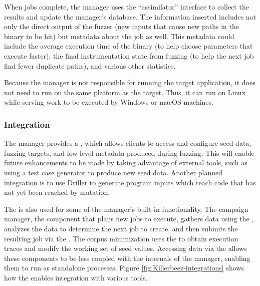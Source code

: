When jobs complete, the manager uses the \BOINC{} ``assimilator'' interface to
collect the results and update the manager's database. The information inserted
includes not only the direct output of the fuzzer (new inputs that cause new
paths in the binary to be hit) but metadata about the job as well. This metadata
could include the average execution time of the binary (to help choose
parameters that execute faster), the final instrumentation state from fuzzing
(to help the next job find fewer duplicate paths), and various other statistics.

Because the manager is not responsible for running the target application, it
does not need to run on the same platform as the target.  Thus, it can run on Linux while
serving work to be executed by Windows or macOS machines.

\subsubsection{Integration}
The manager provides a \REST{} \API{}, which allows clients
to access and configure seed data, fuzzing targets, and low-level metadata
produced during fuzzing.
This will enable future enhancements to be made by taking advantage of
external tools, such as
using a test case generator to produce new seed data. Another planned integration
is to use Driller\cite{driller} to generate program inputs which reach
code that has not yet been reached by mutation.

The \REST{} \API{} is also used for some of the manager's built-in
functionality. The campaign manager, the component that plans new jobs to
execute, gathers data using the \REST{} \API{}, analyzes the data to determine the
next job to create, and then submits the resulting job via the \REST{} \API{}.
The corpus minimization uses the \REST{} \API{} to obtain execution traces and
modify the working set of seed values. Accessing data via the \REST{} \API{}
allows these components to be less coupled with the internals of the manager,
enabling them to run as standalone processes. Figure
\ref{fig:Killerbeez-integrations} shows how the \REST{} \API{} enables
integration with various tools.

